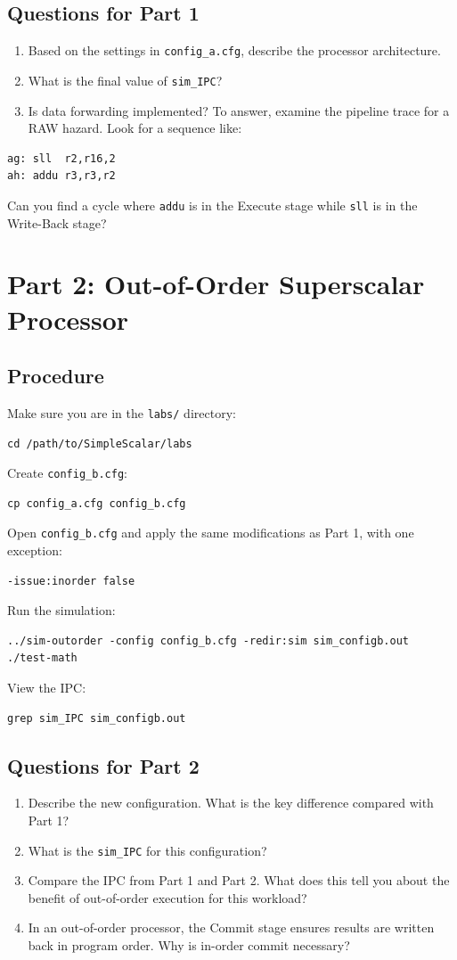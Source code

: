 \documentclass[11pt]{article}
\begin{document}
\subsection{Questions for Part 1}
\begin{enumerate}
\item Based on the settings in \texttt{config\_a.cfg}, describe the processor architecture.
\item What is the final value of \texttt{sim\_IPC}?
\item Is data forwarding implemented? To answer, examine the pipeline trace for a RAW hazard. Look for a sequence like:
\end{enumerate}
\begin{lstlisting}
ag: sll  r2,r16,2
ah: addu r3,r3,r2
\end{lstlisting}
Can you find a cycle where \texttt{addu} is in the Execute stage while \texttt{sll} is in the Write-Back stage?
\section{Part 2: Out-of-Order Superscalar Processor}
\subsection{Procedure}
Make sure you are in the \texttt{labs/} directory:
\begin{lstlisting}
cd /path/to/SimpleScalar/labs
\end{lstlisting}
Create \texttt{config\_b.cfg}:
\begin{lstlisting}
cp config_a.cfg config_b.cfg
\end{lstlisting}
Open \texttt{config\_b.cfg} and apply the same modifications as Part 1, with one exception:
\begin{lstlisting}
-issue:inorder false
\end{lstlisting}
Run the simulation:
\begin{lstlisting}
../sim-outorder -config config_b.cfg -redir:sim sim_configb.out ./test-math
\end{lstlisting}
View the IPC:
\begin{lstlisting}
grep sim_IPC sim_configb.out
\end{lstlisting}
\subsection{Questions for Part 2}
\begin{enumerate}
\item Describe the new configuration. What is the key difference compared with Part 1?
\item What is the \texttt{sim\_IPC} for this configuration?
\item Compare the IPC from Part 1 and Part 2. What does this tell you about the benefit of out-of-order execution for this workload?
\item In an out-of-order processor, the Commit stage ensures results are written back in program order. Why is in-order commit necessary?
\end{enumerate}
\end{document}
